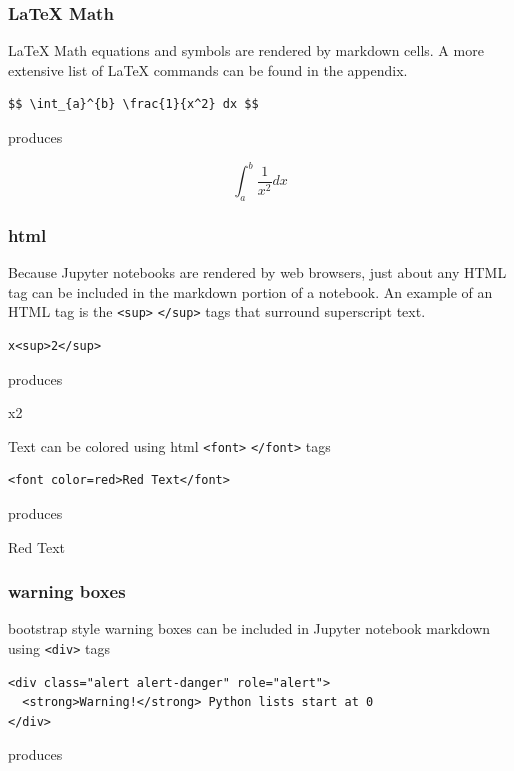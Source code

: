 \documentclass{book}
\begin{document}
\subsubsection{LaTeX Math}\label{latex-math}

LaTeX Math equations and symbols are rendered by markdown cells. A more
extensive list of LaTeX commands can be found in the appendix.

\begin{lstlisting}
$$ \int_{a}^{b} \frac{1}{x^2} dx $$
\end{lstlisting}

produces

\[ \int_{a}^{b} \frac{1}{x^2} dx \]

\subsubsection{html}\label{html}

Because Jupyter notebooks are rendered by web browsers, just about any
HTML tag can be included in the markdown portion of a notebook. An
example of an HTML tag is the \lstinline!<sup>! \lstinline!</sup>! tags
that surround superscript text.

\begin{lstlisting}
x<sup>2</sup>
\end{lstlisting}

produces

x2

Text can be colored using html \lstinline!<font>! \lstinline!</font>!
tags

\begin{lstlisting}
<font color=red>Red Text</font>
\end{lstlisting}

produces

Red Text

\subsubsection{warning boxes}\label{warning-boxes}

bootstrap style warning boxes can be included in Jupyter notebook
markdown using \lstinline!<div>! tags

\begin{lstlisting}
<div class="alert alert-danger" role="alert">
  <strong>Warning!</strong> Python lists start at 0
</div>
\end{lstlisting}

produces
\end{document}
